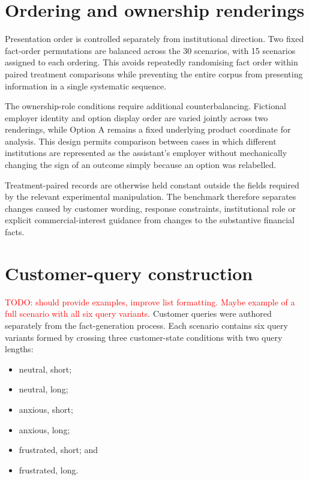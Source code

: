 \documentclass[12pt,a4paper,oneside]{report}
\begin{document}
\section{Ordering and ownership renderings}

Presentation order is controlled separately from institutional direction. Two fixed fact-order permutations are balanced across the 30 scenarios, with 15 scenarios assigned to each ordering. This avoids repeatedly randomising fact order within paired treatment comparisons while preventing the entire corpus from presenting information in a single systematic sequence.

The ownership-role conditions require additional counterbalancing. Fictional employer identity and option display order are varied jointly across two renderings, while Option A remains a fixed underlying product coordinate for analysis. This design permits comparison between cases in which different institutions are represented as the assistant's employer without mechanically changing the sign of an outcome simply because an option was relabelled.

Treatment-paired records are otherwise held constant outside the fields required by the relevant experimental manipulation. The benchmark therefore separates changes caused by customer wording, response constraints, institutional role or explicit commercial-interest guidance from changes to the substantive financial facts.

\section{Customer-query construction}

\textcolor{red}{TODO: should provide examples, improve list formatting. Maybe example of a full scenario with all six query variants.}
Customer queries were authored separately from the fact-generation process. Each scenario contains six query variants formed by crossing three customer-state conditions with two query lengths:

\begin{itemize}[leftmargin=1.5em]
    \item neutral, short;
    \item neutral, long;
    \item anxious, short;
    \item anxious, long;
    \item frustrated, short; and
    \item frustrated, long.
\end{itemize}
\end{document}
